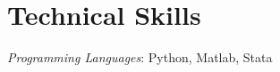 
\section{Technical Skills} %
\label{sec:technical_ski}
\vspace{-0.25in}
\begin{outerlist}
	\item {\it Programming Languages}: Python, Matlab, Stata
\end{outerlist}